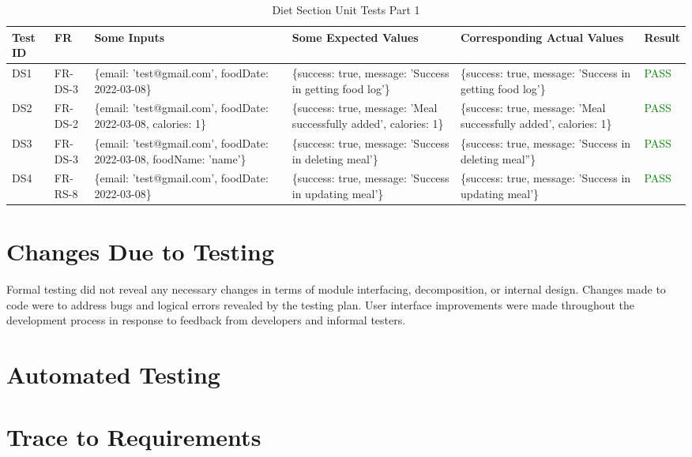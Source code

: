 \documentclass[12pt, titlepage]{article}
\begin{document}
\begin{table}[h]
    \centering
    \small
    \begin{tabularx}{\textwidth}{|X|X|p{3cm}|p{2.5cm}|p{2.5cm}|X|}
        \hline
        Test ID & FR & Some Inputs & Some Expected Values & Corresponding Actual Values & Result \\
        \hline
        DS1 & FR-DS-3 & \{email: 'test@gmail.com', foodDate: 2022-03-08\}  & \{success: true, message: 'Success in getting food log'\} & \{success: true, message: 'Success in getting food log'\} & \textcolor{Green}{PASS} \\
	\hline
        DS2 & FR-DS-2 & \{email: 'test@gmail.com', foodDate: 2022-03-08, calories: 1\}  & \{success: true, message: 'Meal successfully added', calories: 1\} & \{success: true, message: 'Meal successfully added', calories: 1\} & \textcolor{Green}{PASS} \\
        \hline
        DS3 & FR-DS-3 & \{email: 'test@gmail.com', foodDate: 2022-03-08, foodName: 'name'\}  & \{success: true, message: 'Success in deleting meal'\} & \{success: true, message: 'Success in deleting meal''\} & \textcolor{Green}{PASS} \\
        \hline
        DS4 & FR-RS-8 & \{email: 'test@gmail.com', foodDate: 2022-03-08\}  & \{success: true, message: 'Success in updating meal'\} & \{success: true, message: 'Success in updating meal'\} & \textcolor{Green}{PASS} \\
        \hline
    \end{tabularx}
    \caption{Diet Section Unit Tests Part 1}
    \label{table:diet-unit-tests}
\end{table}

\newpage

\section{Changes Due to Testing}
Formal testing did not reveal any necessary changes in terms of module interfacing, decomposition, or internal design. Changes made to code were to address bugs and logical errors revealed by the testing plan. User interface improvements were made throughout the development process in response to feedback from developers and informal testers.

\section{Automated Testing}

\section{Trace to Requirements}
\end{document}
